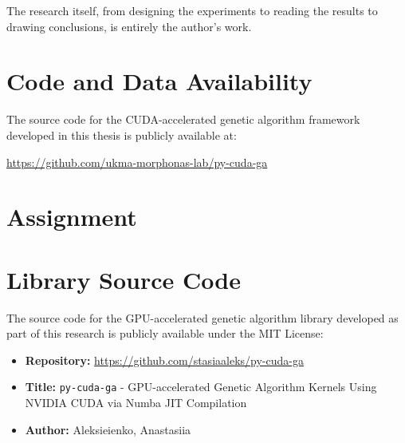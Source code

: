 The research itself, from designing the experiments to reading the results to drawing conclusions, is entirely the author's work.

\newpage
\section*{Code and Data Availability}

The source code for the CUDA-accelerated genetic algorithm framework developed in this thesis is publicly available at:

\url{https://github.com/ukma-morphonas-lab/py-cuda-ga}

\newpage
\appendix




\section{Assignment}



\newpage
\section{Library Source Code}
\label{app:library}

The source code for the GPU-accelerated genetic algorithm library developed as part of this research is publicly available under the MIT License:

\begin{itemize}
  \item \textbf{Repository:} \url{https://github.com/stasiaaleks/py-cuda-ga}
  \item \textbf{Title:} \texttt{py-cuda-ga} - GPU-accelerated Genetic Algorithm Kernels Using NVIDIA CUDA via Numba JIT Compilation
  \item \textbf{Author:} Aleksieienko, Anastasiia
\end{itemize}

\newpage
\printbibliography


